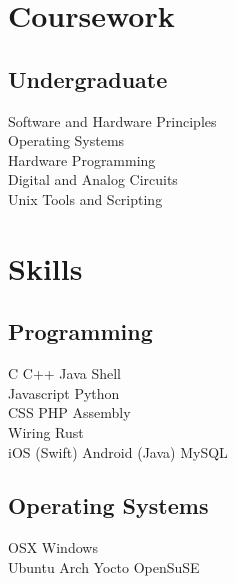 \documentclass[]{deedy-resume-openfont}
\begin{document}
\begin{minipage}[t]{0.33\textwidth}
\section{Coursework}
\subsection{Undergraduate}
Software and Hardware Principles \\
Operating Systems \\
Hardware Programming \\
Digital and Analog Circuits \\
Unix Tools and Scripting \\
\sectionsep


\section{Skills}
\subsection{Programming}
C \textbullet{}   C++ \textbullet{} Java \textbullet{} Shell \\
Javascript \textbullet{} Python \\ 
CSS \textbullet{} PHP \textbullet{} Assembly \\
Wiring \textbullet{} Rust \\
iOS (Swift) \textbullet{} Android (Java) \textbullet{} MySQL
\subsection{Operating Systems}
OSX \textbullet{} Windows \\
Ubuntu \textbullet{} Arch \textbullet{} Yocto \textbullet{} OpenSuSE
\sectionsep

%
%

\end{minipage} 
\hfill
\end{document}
